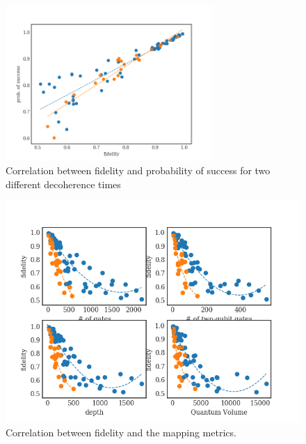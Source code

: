 \begin{figure}[htbp]
\centering
\includegraphics[width=0.7\textwidth]{figures/f_ps_correlation_with_meas_error.png}
\caption{\label{fig:orgd7b074b}
Correlation between fidelity and probability of success for two different decoherence times}
\end{figure}

\begin{figure}[htbp]
\centering
\includegraphics[width=\textwidth]{figures/f_metrics_correlation.png}
\caption{\label{fig:org697744d}
Correlation between fidelity and the mapping metrics.}
\end{figure}

